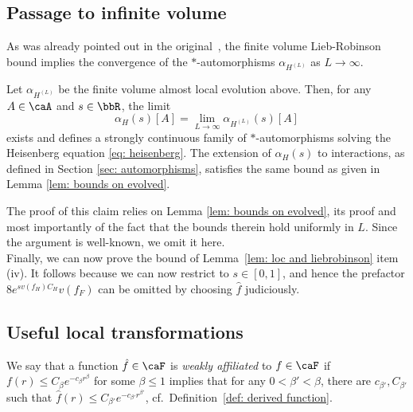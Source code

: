 \subsection{Passage to infinite volume}\label{sec: passage to infinite volume}

As was already pointed out in the original~\cite{Lieb:1972ts}, the finite volume Lieb-Robinson bound implies the convergence of the $*$-automorphisms $\alpha_{H^{(L)}}$ as $L\to\infty$.
\begin{lemma} \label{lem: LRB in inf volume}
	Let $\alpha_{H^{(L)}}$ be the finite volume almost local evolution above. Then, for any $A\in\caA$ and $s\in \bbR$, the limit
	$$
	\alpha_H(s)[A]=\lim_{L\to\infty}\alpha_{H^{(L)}}(s)[A]
	$$
	exists and defines a strongly continuous family of $*$-automorphisms solving the Heisenberg equation \eqref{eq: heisenberg}.  The extension of $\alpha_H(s)$ to interactions, as defined in Section \ref{sec: automorphisms}, satisfies the same bound as given in Lemma \ref{lem: bounds on evolved}.
\end{lemma}
The proof of this claim relies on Lemma \ref{lem: bounds on evolved}, its proof and most importantly of the fact that the bounds therein hold uniformly in $L$. Since the argument is well-known, we omit it here.\\



Finally, we can now prove the bound of Lemma~\ref{lem: loc and liebrobinson} item (iv). It follows because we can now restrict to $s\in [0,1]$, and hence the prefactor $8 e^{ s v(f_H) C_H}   v( f_F) $ can be omitted by choosing $\hat{f}$ judiciously. 



\subsection{Useful local transformations}

We say that a function $\hat{f}\in\caF$ is \emph{weakly affiliated} to $f\in\caF$ if $f(r)\leq C_\beta e^{-c_\beta r^{\beta}}$ for some $\beta \leq 1$ implies that for any $0<\beta'<\beta$, there are $c_{\beta'},C_{\beta'}$ such that $\hat f(r)\leq C_{\beta'} e^{-c_{\beta'} r^{\beta'}}$, cf.\ Definition~\ref{def: derived function}.\\


